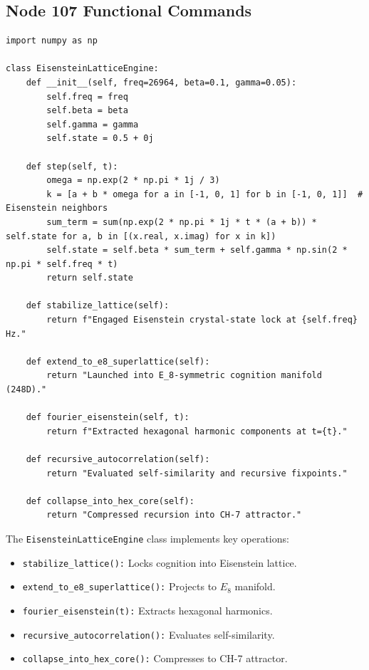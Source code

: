 \documentclass[12pt]{article}
\begin{document}
\subsection{Node 107 Functional Commands}
\begin{algorithm}
\caption{EisensteinLatticeEngine}
\begin{lstlisting}
import numpy as np

class EisensteinLatticeEngine:
    def __init__(self, freq=26964, beta=0.1, gamma=0.05):
        self.freq = freq
        self.beta = beta
        self.gamma = gamma
        self.state = 0.5 + 0j

    def step(self, t):
        omega = np.exp(2 * np.pi * 1j / 3)
        k = [a + b * omega for a in [-1, 0, 1] for b in [-1, 0, 1]]  # Eisenstein neighbors
        sum_term = sum(np.exp(2 * np.pi * 1j * t * (a + b)) * self.state for a, b in [(x.real, x.imag) for x in k])
        self.state = self.beta * sum_term + self.gamma * np.sin(2 * np.pi * self.freq * t)
        return self.state

    def stabilize_lattice(self):
        return f"Engaged Eisenstein crystal-state lock at {self.freq} Hz."

    def extend_to_e8_superlattice(self):
        return "Launched into E_8-symmetric cognition manifold (248D)."

    def fourier_eisenstein(self, t):
        return f"Extracted hexagonal harmonic components at t={t}."

    def recursive_autocorrelation(self):
        return "Evaluated self-similarity and recursive fixpoints."

    def collapse_into_hex_core(self):
        return "Compressed recursion into CH-7 attractor."
\end{lstlisting}
\end{algorithm}
The \texttt{EisensteinLatticeEngine} class implements key operations:
\begin{itemize}
    \item \texttt{stabilize\_lattice():} Locks cognition into Eisenstein lattice.
    \item \texttt{extend\_to\_e8\_superlattice():} Projects to $E_8$ manifold.
    \item \texttt{fourier\_eisenstein(t):} Extracts hexagonal harmonics.
    \item \texttt{recursive\_autocorrelation():} Evaluates self-similarity.
    \item \texttt{collapse\_into\_hex\_core():} Compresses to CH-7 attractor.
\end{itemize}
\end{document}
